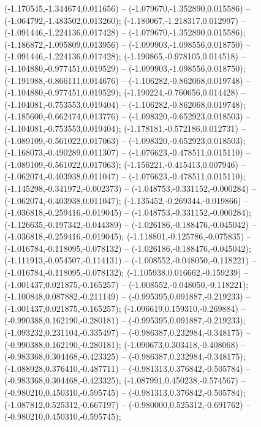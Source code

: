  (-1.170545,-1.344674,0.011656) -- (-1.079670,-1.352890,0.015586) -- (-1.064792,-1.483502,0.013260);
 (-1.180067,-1.218317,0.012997) -- (-1.091446,-1.224136,0.017428) -- (-1.079670,-1.352890,0.015586);
 (-1.186872,-1.095809,0.013956) -- (-1.099903,-1.098556,0.018750) -- (-1.091446,-1.224136,0.017428);
 (-1.190865,-0.978105,0.014518) -- (-1.104880,-0.977451,0.019529) -- (-1.099903,-1.098556,0.018750);
 (-1.191988,-0.866111,0.014676) -- (-1.106282,-0.862068,0.019748) -- (-1.104880,-0.977451,0.019529);
 (-1.190224,-0.760656,0.014428) -- (-1.104081,-0.753553,0.019404) -- (-1.106282,-0.862068,0.019748);
 (-1.185600,-0.662474,0.013776) -- (-1.098320,-0.652923,0.018503) -- (-1.104081,-0.753553,0.019404);
 (-1.178181,-0.572186,0.012731) -- (-1.089109,-0.561022,0.017063) -- (-1.098320,-0.652923,0.018503);
 (-1.168073,-0.490289,0.011307) -- (-1.076623,-0.478511,0.015110) -- (-1.089109,-0.561022,0.017063);
 (-1.156221,-0.415413,0.007946) -- (-1.062074,-0.403938,0.011047) -- (-1.076623,-0.478511,0.015110);
 (-1.145298,-0.341972,-0.002373) -- (-1.048753,-0.331152,-0.000284) -- (-1.062074,-0.403938,0.011047);
 (-1.135452,-0.269344,-0.019866) -- (-1.036818,-0.259416,-0.019045) -- (-1.048753,-0.331152,-0.000284);
 (-1.126635,-0.197342,-0.044389) -- (-1.026186,-0.188476,-0.045042) -- (-1.036818,-0.259416,-0.019045);
 (-1.118801,-0.125786,-0.075835) -- (-1.016784,-0.118095,-0.078132) -- (-1.026186,-0.188476,-0.045042);
 (-1.111913,-0.054507,-0.114131) -- (-1.008552,-0.048050,-0.118221) -- (-1.016784,-0.118095,-0.078132);
 (-1.105938,0.016662,-0.159239) -- (-1.001437,0.021875,-0.165257) -- (-1.008552,-0.048050,-0.118221);
 (-1.100848,0.087882,-0.211149) -- (-0.995395,0.091887,-0.219233) -- (-1.001437,0.021875,-0.165257);
 (-1.096619,0.159310,-0.269884) -- (-0.990388,0.162190,-0.280181) -- (-0.995395,0.091887,-0.219233);
 (-1.093232,0.231104,-0.335497) -- (-0.986387,0.232984,-0.348175) -- (-0.990388,0.162190,-0.280181);
 (-1.090673,0.303418,-0.408068) -- (-0.983368,0.304468,-0.423325) -- (-0.986387,0.232984,-0.348175);
 (-1.088928,0.376410,-0.487711) -- (-0.981313,0.376842,-0.505784) -- (-0.983368,0.304468,-0.423325);
 (-1.087991,0.450238,-0.574567) -- (-0.980210,0.450310,-0.595745) -- (-0.981313,0.376842,-0.505784);
 (-1.087812,0.525312,-0.667197) -- (-0.980000,0.525312,-0.691762) -- (-0.980210,0.450310,-0.595745);
